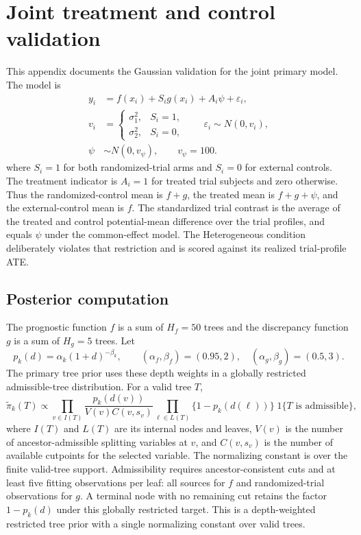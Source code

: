 \section{Joint treatment and control validation}
\label{sec:G}

This appendix documents the Gaussian validation for the joint primary model. The model is
\begin{equation}
\begin{aligned}
 y_i&=f(x_i)+S_i g(x_i)+A_i\psi+\varepsilon_i,\\
 v_i&=\begin{cases}
 \sigma_1^2,&S_i=1,\\
 \sigma_2^2,&S_i=0,
 \end{cases}
 \qquad \varepsilon_i\sim N(0,v_i),\\
 \psi&\sim N(0,v_\psi),\qquad v_\psi=100.
\end{aligned}
 \label{eq:joint_app_model}
\end{equation}
where $S_i=1$ for both randomized-trial arms and $S_i=0$ for external controls. The treatment indicator is $A_i=1$ for treated trial subjects and zero otherwise. Thus the randomized-control mean is $f+g$, the treated mean is $f+g+\psi$, and the external-control mean is $f$. The standardized trial contrast is the average of the treated and control potential-mean difference over the trial profiles, and equals $\psi$ under the common-effect model. The Heterogeneous condition deliberately violates that restriction and is scored against its realized trial-profile ATE.

\subsection{Posterior computation}

The prognostic function $f$ is a sum of $H_f=50$ trees and the discrepancy function $g$ is a sum of $H_g=5$ trees. Let
\[
 p_k(d)=\alpha_k(1+d)^{-\beta_k},\qquad
 (\alpha_f,\beta_f)=(0.95,2),\quad (\alpha_g,\beta_g)=(0.5,3).
\]
The primary tree prior uses these depth weights in a globally restricted admissible-tree distribution. For a valid tree $T$,
\begin{equation}
 \widetilde\pi_k(T)\propto
 \prod_{v\in I(T)}\frac{p_k(d(v))}{V(v)C(v,s_v)}
 \prod_{\ell\in L(T)}\{1-p_k(d(\ell))\}
 \;1\{T\text{ is admissible}\},
 \label{eq:joint_treeweight}
\end{equation}
where $I(T)$ and $L(T)$ are its internal nodes and leaves, $V(v)$ is the number of ancestor-admissible splitting variables at $v$, and $C(v,s_v)$ is the number of available cutpoints for the selected variable. The normalizing constant is over the finite valid-tree support. Admissibility requires ancestor-consistent cuts and at least five fitting observations per leaf: all sources for $f$ and randomized-trial observations for $g$. A terminal node with no remaining cut retains the factor $1-p_k(d)$ under this globally restricted target. This is a depth-weighted restricted tree prior with a single normalizing constant over valid trees.

